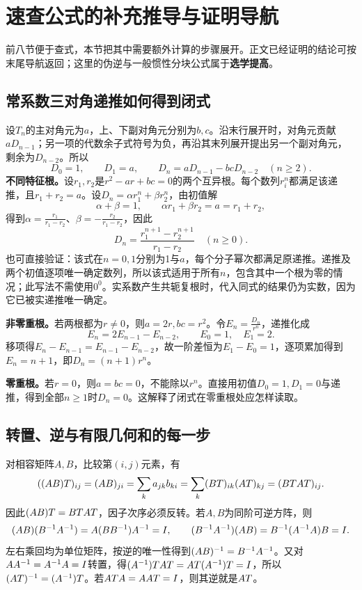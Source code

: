 \section{速查公式的补充推导与证明导航}\label{sec:formula-derivations}
前八节便于查式，本节把其中需要额外计算的步骤展开。正文已经证明的结论可按末尾导航返回；这里的伪逆与一般惯性分块公式属于\textbf{选学提高}。

\subsection{常系数三对角递推如何得到闭式}\label{der:tri-closed}
设$T_n$的主对角元为$a$，上、下副对角元分别为$b,c$。沿末行展开时，对角元贡献$aD_{n-1}$；另一项的代数余子式符号为负，再沿其末列展开提出另一个副对角元，剩余为$D_{n-2}$。所以
\[
D_0=1,\qquad D_1=a,\qquad D_n=aD_{n-1}-bcD_{n-2}\quad(n\ge2).
\]
\textbf{不同特征根。}设$r_1,r_2$是$r^2-ar+bc=0$的两个互异根。每个数列$r_i^n$都满足该递推，且$r_1+r_2=a$。设$D_n=\alpha r_1^n+\beta r_2^n$，由初值解
\[
\alpha+\beta=1,\qquad \alpha r_1+\beta r_2=a=r_1+r_2,
\]
得到$\alpha=\frac{r_1}{r_1-r_2}$、$\beta=-\frac{r_2}{r_1-r_2}$，因此
\[
D_n=\dfrac{r_1^{n+1}-r_2^{n+1}}{r_1-r_2}\quad(n\ge0).
\]
也可直接验证：该式在$n=0,1$分别为1与$a$，每个分子幂次都满足原递推。递推及两个初值逐项唯一确定数列，所以该式适用于所有$n$，包含其中一个根为零的情况；此写法不需使用$0^0$。实系数产生共轭复根时，代入同式的结果仍为实数，因为它已被实递推唯一确定。

\textbf{非零重根。}若两根都为$r\ne0$，则$a=2r,bc=r^2$。令$E_n=\frac{D_n}{r^n}$，递推化成
\[
E_n=2E_{n-1}-E_{n-2},\qquad E_0=1,\quad E_1=2.
\]
移项得$E_n-E_{n-1}=E_{n-1}-E_{n-2}$，故一阶差恒为$E_1-E_0=1$，逐项累加得到$E_n=n+1$，即$D_n=(n+1)r^n$。

\textbf{零重根。}若$r=0$，则$a=bc=0$，不能除以$r^n$。直接用初值$D_0=1,D_1=0$与递推，得到全部$n\ge1$时$D_n=0$。这解释了闭式在零重根处应怎样读取。

\subsection{转置、逆与有限几何和的每一步}\label{der:inverse-identities}
对相容矩阵$A,B$，比较第$(i,j)$元素，有
\[
((AB)T)_{ij}=(AB)_{ji}=\sum_k a_{jk}b_{ki}
=\sum_k(BT)_{ik}(AT)_{kj}=(BT AT)_{ij}.
\]
因此$(AB)T=BT AT$，因子次序必须反转。若$A,B$为同阶可逆方阵，则
\[
(AB)(B^{-1} A^{-1})=A(BB^{-1})A^{-1}=I,
\qquad
(B^{-1} A^{-1})(AB)=B^{-1}(A^{-1} A)B=I.
\]
左右乘回均为单位矩阵，按逆的唯一性得到$(AB)^{-1}=B^{-1} A^{-1}$。又对$AA^{-1}=A^{-1} A=I$转置，得$(A^{-1})T AT=AT(A^{-1})T=I$，所以$(AT)^{-1}=(A^{-1})T$。若$AT A=AAT=I$，则其逆就是$AT$。


